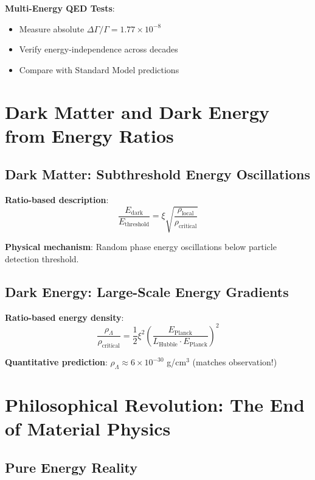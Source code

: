 \documentclass[12pt,a4paper]{article}
\newcommand{\Efield}{E}
\newcommand{\xipar}{\xi}
\theoremstyle{definition}
\theoremstyle{remark}
\begin{document}
	\textbf{Multi-Energy QED Tests}:
	\begin{itemize}
		\item Measure absolute $\Delta\Gamma/\Gamma = 1.77 \times 10^{-8}$
		\item Verify energy-independence across decades
		\item Compare with Standard Model predictions
	\end{itemize}
	
	\section{Dark Matter and Dark Energy from Energy Ratios}
	
	\subsection{Dark Matter: Subthreshold Energy Oscillations}
	
	\textbf{Ratio-based description}:
	\begin{equation}
		\frac{\Efield_{\text{dark}}}{\Efield_{\text{threshold}}} = \xipar \sqrt{\frac{\rho_{\text{local}}}{\rho_{\text{critical}}}}
	\end{equation}
	
	\textbf{Physical mechanism}: Random phase energy oscillations below particle detection threshold.
	
	\subsection{Dark Energy: Large-Scale Energy Gradients}
	
	\textbf{Ratio-based energy density}:
	\begin{equation}
		\frac{\rho_{\Lambda}}{\rho_{\text{critical}}} = \frac{1}{2} \xipar^2 \left(\frac{E_{\text{Planck}}}{L_{\text{Hubble}} \cdot E_{\text{Planck}}}\right)^2
	\end{equation}
	
	\textbf{Quantitative prediction}: $\rho_{\Lambda} \approx 6 \times 10^{-30}$ g/cm$^3$ (matches observation!)
	
	\section{Philosophical Revolution: The End of Material Physics}
	
	\subsection{Pure Energy Reality}
	
\end{document}
